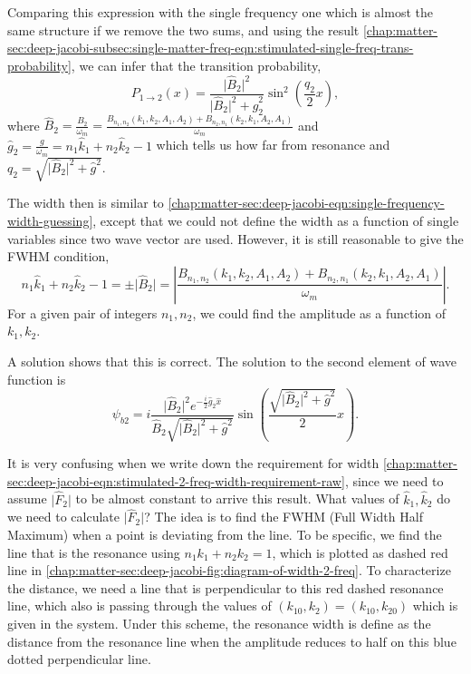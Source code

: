 Comparing this expression with the single frequency one which is almost the same structure if we remove the two sums, and using the result \ref{chap:matter-sec:deep-jacobi-subsec:single-matter-freq-eqn:stimulated-single-freq-trans-probability}, we can infer that the transition probability,
\begin{equation}
    P_{1\to 2}(x) = \frac{\lvert \hat B_2 \rvert^2}{ \lvert \hat B_2 \rvert^2 + \hat g_2^2} \sin^2\left( \frac{q_2}{2}x \right),
\end{equation}
where $\hat B_2=\frac{ B_2 }{\omega_m}=\frac{B_{n_1,n_2}(k_1,k_2,A_1,A_2) + B_{n_2,n_1}(k_2,k_1,A_2,A_1)}{\omega_m}$ and $\hat g_2 = \frac{g}{\omega_m} = n_1 \hat k_1 + n_2 \hat k_2 - 1$ which tells us how far from resonance and $q_2=\sqrt{ \lvert \hat B_2 \rvert^2 + \hat g^2 }$.

The width then is similar to \ref{chap:matter-sec:deep-jacobi-eqn:single-frequency-width-guessing}, except that we could not define the width as a function of single variables since two wave vector are used. However, it is still reasonable to give the FWHM condition,
\begin{equation}
   n_1 \hat k_1 + n_2 \hat k_2 - 1 = \pm \lvert \hat B_2 \rvert = \left\lvert \frac{B_{n_1,n_2}(k_1,k_2,A_1,A_2) + B_{n_2,n_1}(k_2,k_1,A_2,A_1)}{\omega_m} \right\rvert.
   \label{chap:matter-sec:deep-jacobi-eqn:stimulated-2-freq-width-requirement-raw}
\end{equation}
For a given pair of integers $n_1,n_2$, we could find the amplitude as a function of $k_1, k_2$.

A solution shows that this is correct. The solution to the second element of wave function is
\begin{equation}
  \psi_{b2} = i \frac{ \lvert \hat B_2\rvert^2 e^{-\frac{i}{2} \hat g_2 \hat x} }{ \hat B_2 \sqrt{\lvert \hat B_2\rvert^2 + \hat g^2} }\sin\left( \frac{\sqrt{ \lvert \hat B_2 \rvert^2 + \hat g^2 }}{2}x \right)  .
\end{equation}

It is very confusing when we write down the requirement for width \ref{chap:matter-sec:deep-jacobi-eqn:stimulated-2-freq-width-requirement-raw}, since we need to assume $\lvert \hat F_2 \rvert$ to be almost constant to arrive this result. What values of $\hat k_1,\hat k_2$ do we need to calculate $\lvert \hat F_2 \rvert$? The idea is to find the FWHM (Full Width Half Maximum) when a point is deviating from the line. To be specific, we find the line that is the resonance using $n_1 k_1 + n_2 k_2 = 1$, which is plotted as dashed red line in \ref{chap:matter-sec:deep-jacobi-fig:diagram-of-width-2-freq}. To characterize the distance, we need a line that is perpendicular to this red dashed resonance line, which also is passing through the values of $(k_10,k_2)=(k_{10},k_{20})$ which is given in the system. Under this scheme, the resonance width is define as the distance from the resonance line when the amplitude reduces to half on this blue dotted perpendicular line.


